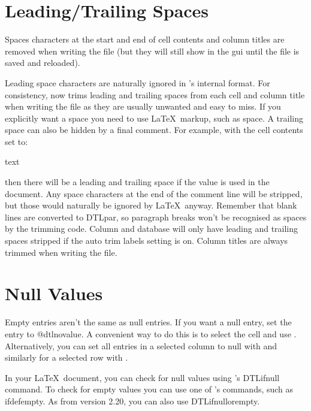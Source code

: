 
\section{Leading/Trailing Spaces}\label{sec:spaces}

Spaces characters at the start and end of cell contents and column titles 
are removed when writing the  file (but they will still show
in the \gls{gui} until the file is saved and reloaded).

Leading space characters are naturally ignored in 's 
internal format. For consistency,  now trims leading and trailing 
spaces from each cell and column title when writing the  
file as they are usually unwanted and easy to miss. If you explicitly want
a space you need to use \LaTeX\ markup, such as \gls{space}. 
A trailing space can also be hidden by a final comment. For
example, with the cell contents set to:
\begin{codebox}
 text 
\end{codebox}
then there will be a leading and trailing space if the value is used in the 
document. Any space characters at the end of the comment line will be 
stripped, but those would naturally be ignored by \LaTeX\ anyway.
Remember that blank lines are converted to \gls{DTLpar}, 
so paragraph breaks won't be recognised as spaces by the trimming code.
Column and database  will only have leading and
trailing spaces stripped if the auto trim labels setting is on.
Column titles are always trimmed when writing the  file.

\section{Null Values}\label{sec:null}

Empty entries aren't the same as null entries. If you want 
a null entry, set the entry to \gls{@dtlnovalue}. 
A convenient way to do this is to select the cell and use
. Alternatively, you can set all entries in 
a selected column to null with 
and similarly for a selected row with .

In your \LaTeX\ document, you can check for null values using 
's \gls{DTLifnull} command. To check for empty 
values you can use one of 's commands, such as 
\gls{ifdefempty}. As from  version 2.20, you
can also use \gls{DTLifnullorempty}.

